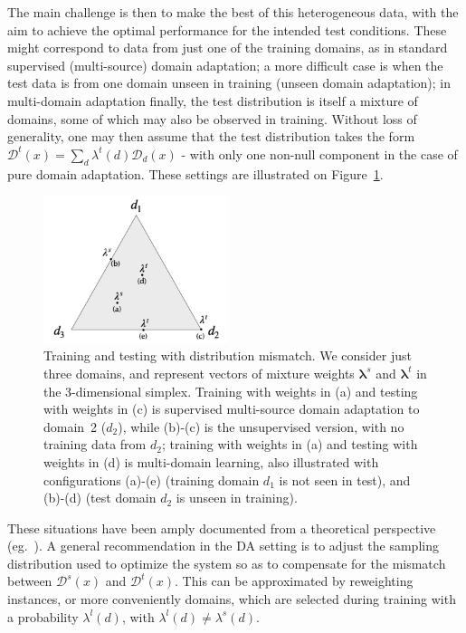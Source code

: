 \documentclass[11pt]{article}
\newcommand{\vlambda}{\ensuremath{\boldsymbol\lambda}\xspace} %
\begin{document}
The main challenge is then to make the best of this heterogeneous data, with the aim to achieve the optimal performance for the intended test conditions. These might correspond to data from just one of the training domains, as in standard supervised (multi-source) domain adaptation; a more difficult case is when the test data is from one domain unseen in training (unseen domain adaptation); in multi-domain adaptation finally, the test distribution is itself a mixture of domains, some of which may also be observed in training.  Without loss of generality, one may then assume that the test distribution takes the form $\mathcal{D}^{t}(x) = \sum_d \lambda^{t}(d) \mathcal{D}_d(x)$ - with only one non-null  component in the case of pure domain adaptation. These settings are illustrated on Figure~\ref{fig:mdmt-lambdas}.
\begin{figure}[h]
  \centering
  \includegraphics[width=0.48\textwidth]{mdmt-lambdas}
  \caption{Training and testing with distribution mismatch. We consider just three domains, and represent vectors of mixture weights $\vlambda^{s}$ and $\vlambda^{t}$ in the 3-dimensional simplex. Training with weights in (a) and testing with weights in (c) is supervised multi-source domain adaptation to domain~2 ($d_2$), while (b)-(c) is the unsupervised version, with no training data from $d_2$; training with weights in (a) and testing with weights in (d) is multi-domain learning, also illustrated with configurations (a)-(e) (training domain $d_1$ is not seen in test), and (b)-(d)  (test domain $d_2$ is unseen in training).}\label{fig:mdmt-lambdas}
\end{figure}

These situations have been amply documented from a theoretical perspective (eg.\ \citet{Mansour09multiple,Mansour09domainadaptation,Hoffman18algorithms}). A general recommendation in the DA setting is to adjust the sampling distribution used to optimize the system so as to compensate for the mismatch between $\mathcal{D}^s(x)$ and $\mathcal{D}^t(x)$. This can be approximated by reweighting instances, or more conveniently domains, which are selected during training with a probability $\lambda^{l}(d)$, with $\lambda^{l}(d) \neq \lambda^{s}(d)$.
\end{document}
